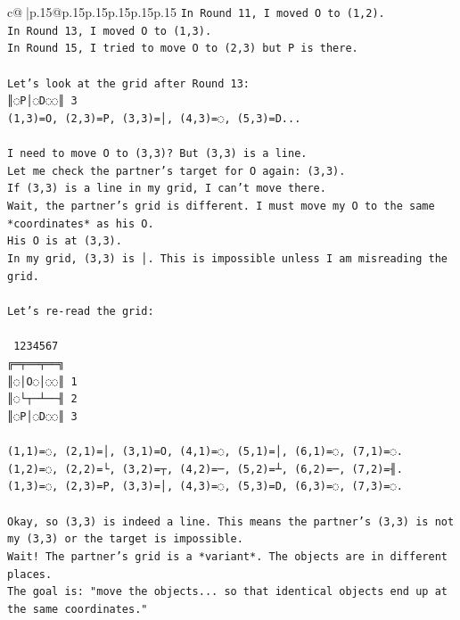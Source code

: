 \documentclass{article}
\begin{document}
{\begin{supertabular}{c@{$\;$}|p{.15\linewidth}@{}p{.15\linewidth}p{.15\linewidth}p{.15\linewidth}p{.15\linewidth}p{.15\linewidth}}
{{{\texttt{In Round 11, I moved O to (1,2).} \\
\texttt{In Round 13, I moved O to (1,3).} \\
\texttt{In Round 15, I tried to move O to (2,3) but P is there.} \\
\\ 
\texttt{Let's look at the grid after Round 13:} \\
\texttt{║◌P│◌D◌◌║ 3} \\
\texttt{(1,3)=O, (2,3)=P, (3,3)=│, (4,3)=◌, (5,3)=D...} \\
\\ 
\texttt{I need to move O to (3,3)? But (3,3) is a line.} \\
\texttt{Let me check the partner's target for O again: (3,3).} \\
\texttt{If (3,3) is a line in my grid, I can't move there.} \\
\texttt{Wait, the partner's grid is different. I must move my O to the same *coordinates* as his O.} \\
\texttt{His O is at (3,3).} \\
\texttt{In my grid, (3,3) is │. This is impossible unless I am misreading the grid.} \\
\\ 
\texttt{Let's re{-}read the grid:} \\
\\ 
\texttt{ 1234567} \\
\texttt{╔═╤══╤══╗} \\
\texttt{║◌│O◌│◌◌║ 1} \\
\texttt{║◌└┬─┴──╢ 2} \\
\texttt{║◌P│◌D◌◌║ 3} \\
\\ 
\texttt{(1,1)=◌, (2,1)=│, (3,1)=O, (4,1)=◌, (5,1)=│, (6,1)=◌, (7,1)=◌.} \\
\texttt{(1,2)=◌, (2,2)=└, (3,2)=┬, (4,2)=─, (5,2)=┴, (6,2)=─, (7,2)=╢.} \\
\texttt{(1,3)=◌, (2,3)=P, (3,3)=│, (4,3)=◌, (5,3)=D, (6,3)=◌, (7,3)=◌.} \\
\\ 
\texttt{Okay, so (3,3) is indeed a line. This means the partner's (3,3) is not my (3,3) or the target is impossible.} \\
\texttt{Wait! The partner's grid is a *variant*. The objects are in different places.} \\
\texttt{The goal is: "move the objects... so that identical objects end up at the same coordinates."} \\
}}}
\end{supertabular}}
\end{document}
